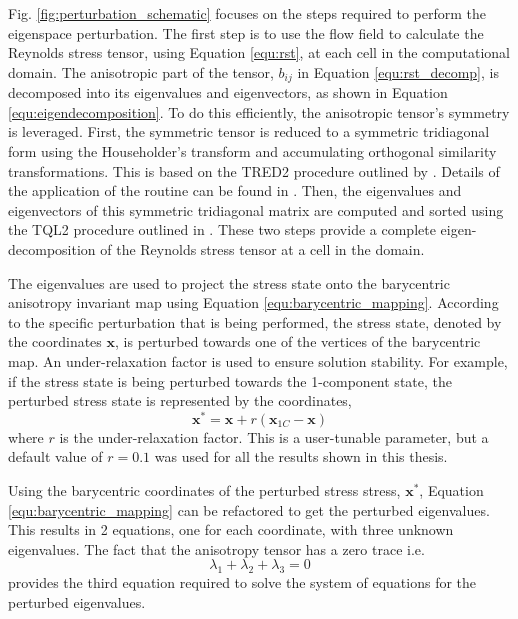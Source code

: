 Fig. \ref{fig:perturbation_schematic} focuses on the steps required to perform the eigenspace perturbation. The first step is to use the flow field to calculate the Reynolds stress tensor, using Equation \ref{equ:rst}, at each cell in the computational domain. The anisotropic part of the tensor, $b_{ij}$ in Equation \ref{equ:rst_decomp}, is decomposed into its eigenvalues and eigenvectors, as shown in Equation \ref{equ:eigendecomposition}. To do this efficiently, the anisotropic tensor's symmetry is leveraged. First, the symmetric tensor is reduced to a symmetric tridiagonal form using the Householder's transform and accumulating orthogonal similarity transformations. This is based on the TRED2 procedure outlined by \cite{tred2a}. Details of the application of the routine can be found in \cite{numres}. Then, the eigenvalues and eigenvectors of this symmetric tridiagonal matrix are computed and sorted using the TQL2 procedure outlined in \cite{tred2b}. These two steps provide a complete eigen-decomposition of the Reynolds stress tensor at a cell in the domain.

The eigenvalues are used to project the stress state onto the barycentric anisotropy invariant map using Equation \ref{equ:barycentric_mapping}. According to the specific perturbation that is being performed, the stress state, denoted by the coordinates $\mathbf{x}$, is perturbed towards one of the vertices of the barycentric map. An under-relaxation factor is used to ensure solution stability. For example, if the stress state is being perturbed towards the 1-component state, the perturbed stress state is represented by the coordinates, 
\begin{equation}
    \mathbf{x^*} = \mathbf{x} + r\left ( \mathbf{x}_{1C} - \mathbf{x} \right )
\end{equation}
where $r$ is the under-relaxation factor. This is a user-tunable parameter, but a default value of $r=0.1$ was used for all the results shown in this thesis. 

Using the barycentric coordinates of the perturbed stress stress, $\mathbf{x^*}$, Equation \ref{equ:barycentric_mapping} can be refactored to get the perturbed eigenvalues. This results in 2 equations, one for each coordinate, with three unknown eigenvalues. The fact that the anisotropy tensor has a zero trace i.e. 
\begin{equation}
    \lambda_1 + \lambda_2 + \lambda_3 = 0
\end{equation}
provides the third equation required to solve the system of equations for the perturbed eigenvalues.

